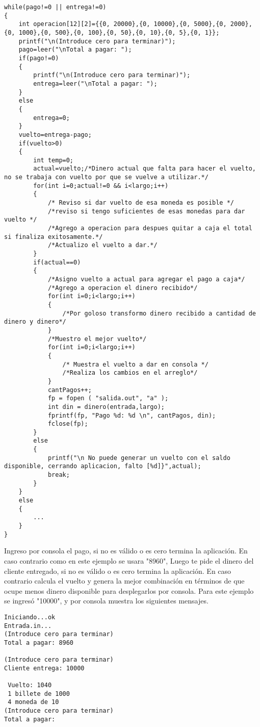 \documentclass[9pt,twocolumn,twoside]{optica}
\begin{document}
\lstset{language=C, breaklines=true, basicstyle=\footnotesize}
\begin{lstlisting}[frame=single]
while(pago!=0 || entrega!=0)
{
	int operacion[12][2]={{0, 20000},{0, 10000},{0, 5000},{0, 2000},{0, 1000},{0, 500},{0, 100},{0, 50},{0, 10},{0, 5},{0, 1}};
	printf("\n(Introduce cero para terminar)");
	pago=leer("\nTotal a pagar: ");
	if(pago!=0)
	{
		printf("\n(Introduce cero para terminar)");
		entrega=leer("\nTotal a pagar: ");
	}
	else
	{
		entrega=0;
	}
	vuelto=entrega-pago;
	if(vuelto>0)
	{
		int temp=0;
		actual=vuelto;/*Dinero actual que falta para hacer el vuelto, no se trabaja con vuelto por que se vuelve a utilizar.*/
		for(int i=0;actual!=0 && i<largo;i++)
		{
			/* Reviso si dar vuelto de esa moneda es posible */
			/*reviso si tengo suficientes de esas monedas para dar vuelto */
			/*Agrego a operacion para despues quitar a caja el total si finaliza exitosamente.*/
			/*Actualizo el vuelto a dar.*/
		}
		if(actual==0)
		{
			/*Asigno vuelto a actual para agregar el pago a caja*/
			/*Agrego a operacion el dinero recibido*/
			for(int i=0;i<largo;i++)
			{
				/*Por goloso transformo dinero recibido a cantidad de dinero y dinero*/
			}
			/*Muestro el mejor vuelto*/
			for(int i=0;i<largo;i++)
			{
				/* Muestra el vuelto a dar en consola */
				/*Realiza los cambios en el arreglo*/
			}
			cantPagos++;
			fp = fopen ( "salida.out", "a" );
			int din = dinero(entrada,largo);
			fprintf(fp, "Pago %d: %d \n", cantPagos, din);
			fclose(fp);
		}
		else
		{
			printf("\n No puede generar un vuelto con el saldo disponible, cerrando aplicacion, falto [%d]}",actual);
			break;
		}
	}
	else
	{
		...
	}
}
\end{lstlisting}

Ingreso por consola el pago, si no es válido o es cero termina la aplicación. En caso contrario como en este ejemplo se usara "8960", Luego te pide el dinero del cliente entregado, si no es válido o es cero termina la aplicación. En caso contrario calcula el vuelto y genera la mejor combinación en términos de que ocupe menos dinero disponible para desplegarlos por consola. Para este ejemplo se ingresó "10000", y por consola muestra los siguientes mensajes.

\lstset{language=C, breaklines=true, basicstyle=\footnotesize}
\begin{lstlisting}[frame=single]
Iniciando...ok 
Entrada.in...
(Introduce cero para terminar)
Total a pagar: 8960

(Introduce cero para terminar)
Cliente entrega: 10000

 Vuelto: 1040
 1 billete de 1000 
 4 moneda de 10 
(Introduce cero para terminar)
Total a pagar: 
\end{lstlisting}
\end{document}
